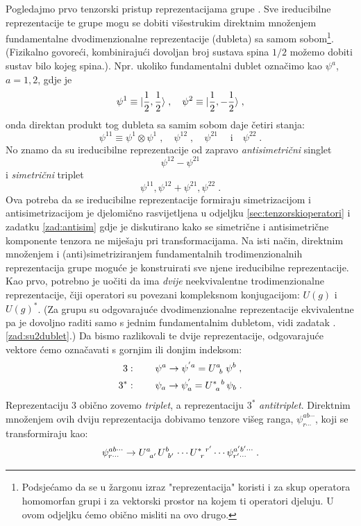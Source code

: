 Pogledajmo prvo tenzorski pristup reprezentacijama grupe .
Sve ireducibilne reprezentacije te grupe mogu se dobiti
višestrukim direktnim množenjem fundamentalne dvodimenzionalne reprezentacije
(dubleta) sa samom sobom\footnote{Podsjećamo da se u žargonu izraz
    "reprezentacija" koristi i za skup operatora homomorfan grupi i za vektorski prostor
    na kojem ti operatori djeluju. U ovom odjeljku ćemo obično
misliti na ovo drugo.}. (Fizikalno govoreći, kombinirajući dovoljan broj
sustava spina $1/2$ možemo dobiti sustav bilo kojeg spina.). Npr. ukoliko
fundamentalni dublet označimo kao
$\psi^a$, $a=1,2$, gdje je 
\begin{displaymath}
 \psi^1 \equiv | \frac{1}{2},\frac{1}{2} \rangle \;, \quad \psi^2
\equiv | \frac{1}{2}, -\frac{1}{2} \rangle \;,
\end{displaymath}
onda direktan produkt tog dubleta sa samim sobom daje četiri stanja:
\begin{displaymath}
 \psi^{11}\equiv \psi^1 \otimes \psi^1 \;, \quad \psi^{12} \;, \quad \psi^{21} \;
 \quad \text{i} \quad \psi^{22} \;.
\end{displaymath}
No znamo da su ireducibilne reprezentacije od  zapravo 
\emph{antisimetrični} singlet
\begin{displaymath}
   \psi^{12} - \psi^{21}
\end{displaymath}
i \emph{simetrični} triplet
\begin{displaymath}
 \psi^{11},  \psi^{12} + \psi^{21}, \psi^{22} \;.
\end{displaymath}
Ova potreba da se ireducibilne reprezentacije formiraju 
simetrizacijom i antisimetrizacijom je djelomično rasvijetljena
u odjeljku \ref{sec:tenzorskioperatori} i zadatku \ref{zad:antisim}
gdje je diskutirano
kako se simetrične i antisimetrične komponente 
tenzora ne miješaju pri transformacijama.
Na isti način, direktnim množenjem i (anti)simetriziranjem
fundamentalnih trodimenzionalnih reprezentacija grupe  moguće
je konstruirati sve njene ireducibilne reprezentacije. Kao prvo, potrebno je uočiti da
 ima \emph{dvije} neekvivalentne trodimenzionalne reprezentacije,
čiji operatori su povezani kompleksnom konjugacijom: $U(g)$ i
$U(g)^*$. (Za  grupu su odgovarajuće dvodimenzionalne reprezentacije ekvivalentne
pa je dovoljno raditi samo s jednim fundamentalnim dubletom, vidi
zadatak \thechapter.\ref{zad:su2dublet}.)
Da bismo razlikovali te dvije reprezentacije, odgovarajuće vektore
ćemo označavati s gornjim ili donjim indeksom:
\begin{align}
 3&: \qquad  \psi^a \to \psi^{'a} = \tensor{U}{^a_b} \, \psi^{b} \;, \\
 3^*&: \qquad  \psi_a \to \psi^{'}_a = \tensor{U}{^*_a^b} \, \psi_{b} \;.
\label{eq:su3fundamental}
\end{align}
Reprezentaciju 3 obično zovemo \emph{triplet}, a
reprezentaciju $3^*$ \emph{antitriplet}.
Direktnim množenjem ovih dviju  reprezentacija dobivamo 
tenzore višeg ranga, $\psi^{ab\cdots}_{r\cdots}$, koji
se transformiraju kao:
\begin{equation}
  \psi^{ab\cdots}_{r\cdots} \to 
 \tensor{U}{^{a}_{a'}} \tensor{U}{^{b}_{b'}} \cdots \tensor{U}{^*_r^{r'}} \cdots
  \psi^{a'b'\cdots}_{r'\cdots} \;.
\label{eq:mntensor}
\end{equation}

